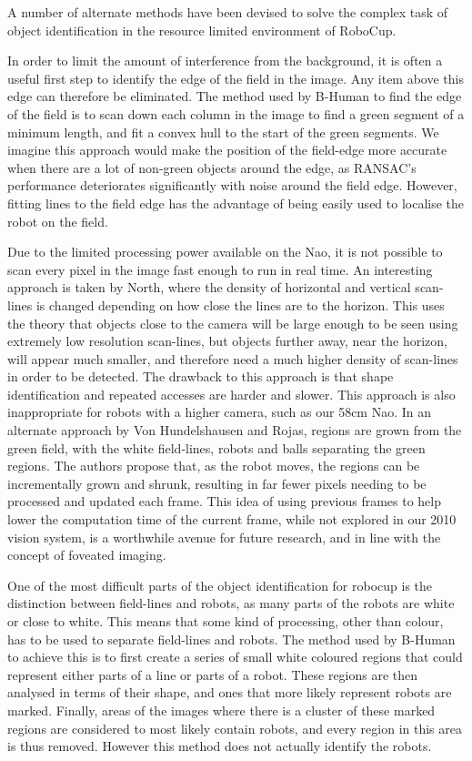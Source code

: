 \documentclass[runningheads,a4paper]{llncs}
\begin{document}
A number of alternate methods have been devised to solve the complex task of object identification in the resource limited environment of RoboCup.

In order to limit the amount of interference from the background, it is often a
useful first step to identify the edge of the field in the image. Any item above
this edge can therefore be eliminated. The method used by B-Human
\cite{thomas09code} to find the edge of the field is to scan down each column in
the image to find a green segment of a minimum length, and fit a convex hull to
the start of the green segments. We imagine this approach would make the
position of the field-edge more accurate when there are a lot of non-green
objects around the edge, as RANSAC's performance deteriorates significantly with noise around the field edge. However, fitting lines to the field edge has the advantage of being easily used to localise the robot on the field.

Due to the limited processing power available on the Nao, it is not possible to
scan every pixel in the image fast enough to run in real time. An interesting
approach is taken by North\cite{north2005object}, where the density of
horizontal and vertical scan-lines is changed depending on how close the
lines are to the horizon. This uses the theory that objects close to the camera
will be large enough to be seen using extremely low resolution scan-lines, but
objects further away, near the horizon, will appear much smaller, and therefore
need a much higher density of scan-lines in order to be detected. The drawback
to this approach is that shape identification and repeated accesses are harder
and slower. This approach is also inappropriate for robots with a higher
camera, such as our 58cm Nao. In an alternate approach by Von Hundelshausen and
Rojas\cite{von2004tracking}, regions are grown from the green field, with the
white field-lines, robots and balls separating the green regions. The authors
propose that, as the robot moves, the regions can be incrementally grown and
shrunk, resulting in far fewer pixels needing to be processed and updated each
frame. This idea of using previous frames to help lower the computation time of
the current frame, while not explored in our 2010 vision system, is a worthwhile
avenue for future research, and in line with the concept of foveated imaging.

One of the most difficult parts of the object identification for robocup is the
distinction between field-lines and robots, as many parts of the robots are
white or close to white. This means that some kind of processing, other than
colour, has to be used to separate field-lines and robots. The method used by
B-Human\cite{thomas09code} to achieve this is to first create a series of small
white coloured regions that could represent either parts of a line or parts of a
robot. These regions are then analysed in terms of their shape, and ones that
more likely represent robots are marked. Finally, areas of the images where
there is a cluster of these marked regions are considered to most likely contain
robots, and every region in this area is thus removed. However this method does
not actually identify the robots.
\end{document}

